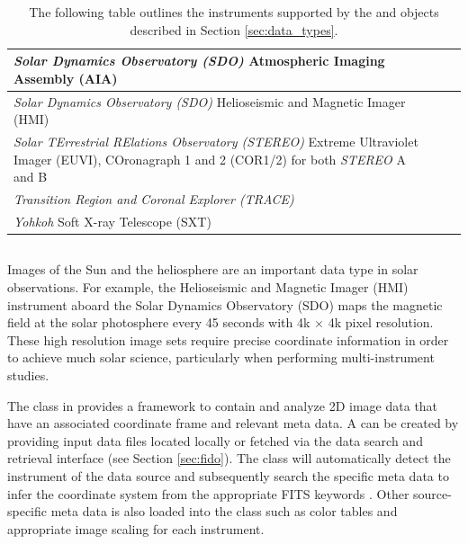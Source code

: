 \begin{table}
\begin{center}
\begin{tabular}{|p{12cm}|c|c|}
\hline
\textit{Solar Dynamics Observatory (SDO)} Atmospheric Imaging Assembly (AIA) & \citep{lemen2012} \\
\hline
\textit{Solar Dynamics Observatory (SDO)} Helioseismic and Magnetic Imager (HMI) & \citep{schou12}  \\
\hline
\textit{Solar TErrestrial RElations Observatory (STEREO)} Extreme Ultraviolet Imager (EUVI), COronagraph 1 and 2 (COR1/2) for both \textit{STEREO} A and B & \citep{howard2008sun} \\
\hline
\textit{Transition Region and Coronal Explorer (TRACE)}  & \citep{handy99}  \\
\hline
\textit{Yohkoh} Soft X-ray Telescope (SXT) & \citep{tsuneta1991soft}  \\
\hline
\end{tabular}
\end{center}
\caption{The following table outlines the instruments supported by the \Timeseries and \Map objects described in Section \ref{sec:data_types}.}
\label{tab:instruments}
\end{table}

\subsection{\Map}
\label{sec:map}
Images of the Sun and the heliosphere are an important data type in solar observations. 
For example, the Helioseismic and Magnetic Imager (HMI) instrument aboard the Solar Dynamics Observatory (SDO) maps the magnetic field at the solar photosphere every 45 seconds with 4k $\times$ 4k pixel resolution. 
These high resolution image sets require precise coordinate information in order to achieve much solar science, particularly when performing multi-instrument studies. 

The \Map class in \sunpypkg provides a framework to contain and analyze 2D image data that have an associated coordinate frame and relevant meta data. 
A \Map can be created by providing input data files located locally or fetched via the \sunpypkg data search and retrieval interface \Fido (see Section \ref{sec:fido}).
The \Map class will automatically detect the instrument of the data source and subsequently search the specific meta data to infer the coordinate system from the appropriate FITS keywords \citep{refId0, 2006A&A...449..791T}. Other source-specific meta data is also loaded into the \Map class such as color tables and appropriate image scaling for each instrument.


